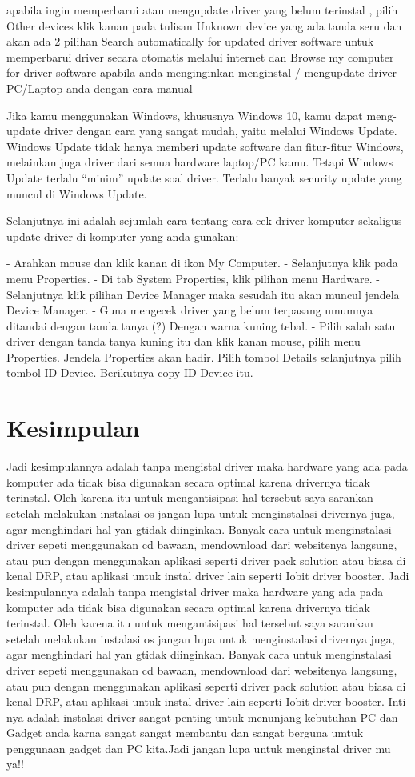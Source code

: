 apabila ingin memperbarui atau mengupdate driver yang belum terinstal , pilih Other devices klik kanan pada tulisan Unknown device yang ada tanda seru dan akan ada 2 pilihan Search automatically for updated driver software untuk memperbarui driver secara otomatis melalui internet dan Browse my computer for driver software apabila anda menginginkan menginstal / mengupdate driver PC/Laptop anda dengan cara manual

Jika kamu menggunakan Windows, khususnya Windows 10, kamu dapat meng-update driver dengan cara yang sangat mudah, yaitu melalui Windows Update.
Windows Update tidak hanya memberi update software dan fitur-fitur Windows, melainkan juga driver dari semua hardware laptop/PC kamu. Tetapi Windows Update terlalu “minim” update soal driver. Terlalu banyak security update yang muncul di Windows Update.

Selanjutnya ini adalah sejumlah cara tentang cara cek driver komputer sekaligus update driver di komputer yang anda gunakan: 

- Arahkan mouse dan klik kanan di ikon My Computer.
- Selanjutnya klik pada menu Properties.
- Di tab System Properties, klik pilihan menu Hardware.
- Selanjutnya klik pilihan Device Manager maka sesudah itu akan muncul jendela Device Manager.
- Guna mengecek driver yang belum terpasang umumnya ditandai dengan tanda tanya (?) Dengan warna kuning tebal.
- Pilih salah satu driver dengan tanda tanya kuning itu dan klik kanan mouse, pilih menu Properties. Jendela Properties akan hadir. Pilih tombol Details selanjutnya pilih tombol ID Device. Berikutnya copy ID Device itu.

\section{Kesimpulan}
Jadi kesimpulannya adalah tanpa mengistal driver maka hardware yang ada pada komputer ada tidak bisa digunakan secara optimal karena drivernya tidak terinstal. Oleh karena itu untuk mengantisipasi hal tersebut saya sarankan setelah melakukan instalasi os jangan lupa untuk menginstalasi drivernya juga, agar menghindari hal yan gtidak diinginkan. Banyak cara untuk menginstalasi driver sepeti menggunakan cd bawaan, mendownload dari websitenya langsung, atau pun dengan menggunakan aplikasi seperti driver pack solution atau biasa di kenal DRP, atau aplikasi untuk instal driver lain seperti Iobit driver booster.
Jadi kesimpulannya adalah tanpa mengistal driver maka hardware yang ada pada komputer ada tidak bisa digunakan secara optimal karena drivernya tidak terinstal. Oleh karena itu untuk mengantisipasi hal tersebut saya sarankan setelah melakukan instalasi os jangan lupa untuk menginstalasi drivernya juga, agar menghindari hal yan gtidak diinginkan. Banyak cara untuk menginstalasi driver sepeti menggunakan cd bawaan, mendownload dari websitenya langsung, atau pun dengan menggunakan aplikasi seperti driver pack solution atau biasa di kenal DRP, atau aplikasi untuk instal driver lain seperti Iobit driver booster. Inti nya adalah instalasi driver sangat penting untuk menunjang kebutuhan PC dan Gadget anda karna sangat sangat membantu dan sangat berguna umtuk penggunaan gadget dan PC kita.Jadi jangan lupa untuk menginstal driver mu ya!!
%